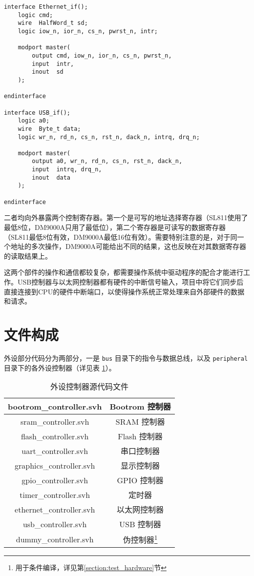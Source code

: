 \begin{verbatim}
interface Ethernet_if();
    logic cmd;
    wire  HalfWord_t sd;
    logic iow_n, ior_n, cs_n, pwrst_n, intr;

    modport master(
        output cmd, iow_n, ior_n, cs_n, pwrst_n,
        input  intr,
        inout  sd
    );

endinterface

interface USB_if();
    logic a0;
    wire  Byte_t data;
    logic wr_n, rd_n, cs_n, rst_n, dack_n, intrq, drq_n;

    modport master(
        output a0, wr_n, rd_n, cs_n, rst_n, dack_n,
        input  intrq, drq_n,
        inout  data
    );

endinterface
\end{verbatim}

二者均向外暴露两个控制寄存器。第一个是可写的地址选择寄存器（SL811使用了最低8位，DM9000A只用了最低位），第二个寄存器是可读写的数据寄存器（SL811最低8位有效，DM9000A最低16位有效）。需要特别注意的是，对于同一个地址的多次操作，DM9000A可能给出不同的结果，这也反映在对其数据寄存器的读取结果上。

这两个部件的操作和通信都较复杂，都需要操作系统中驱动程序的配合才能进行工作。USB控制器与以太网控制器都有硬件的中断信号输入，项目中将它们同步后直接连接到CPU的硬件中断端口，以使得操作系统正常处理来自外部硬件的数据和请求。

\section{文件构成}

外设部分代码分为两部分，一是 \texttt{bus} 目录下的指令与数据总线，以及 \texttt{peripheral} 目录下的各外设控制器（详见表 \ref{table:peripheral_source_files}）。

\begin{table}[htbp]
	\centering
	\begin{tabular}{|c|c|} \hline
		bootrom\_controller.svh & Bootrom 控制器 \\ \hline
		sram\_controller.svh & SRAM 控制器 \\ \hline
		flash\_controller.svh & Flash 控制器 \\ \hline
        uart\_controller.svh & 串口控制器 \\ \hline
        graphics\_controller.svh & 显示控制器 \\ \hline
		gpio\_controller.svh & GPIO 控制器 \\ \hline
		timer\_controller.svh & 定时器 \\ \hline
		ethernet\_controller.svh & 以太网控制器 \\ \hline
		usb\_controller.svh & USB 控制器 \\ \hline
		dummy\_controller.svh & 伪控制器\footnote{用于条件编译，详见第\ref{section:test_hardware}节} \\ \hline
	\end{tabular}
	\caption{外设控制器源代码文件}
	\label{table:peripheral_source_files}
\end{table}